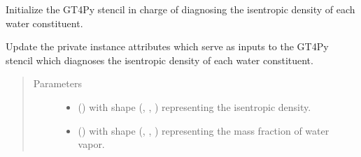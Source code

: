 \documentclass[letterpaper,10pt,english]{sphinxmanual}
\begin{document}
\begin{fulllineitems}
\begin{fulllineitems}
\begin{quote}
\begin{description}
\begin{itemize}
\end{itemize}


\end{description}\end{quote}

\end{fulllineitems}


\begin{fulllineitems}
\label{\detokenize{api:dycore.diagnostic_isentropic.DiagnosticIsentropic._stencil_diagnosing_water_constituents_isentropic_density_initialize}}
Initialize the GT4Py stencil in charge of diagnosing the isentropic density of each water constituent.

\end{fulllineitems}


\begin{fulllineitems}
\label{\detokenize{api:dycore.diagnostic_isentropic.DiagnosticIsentropic._stencil_diagnosing_water_constituents_isentropic_density_set_inputs}}
Update the private instance attributes which serve as inputs to the GT4Py stencil which diagnoses
the isentropic density of each water constituent.
\begin{quote}\begin{description}
\item[{Parameters}] \leavevmode\begin{itemize}
\item {} 
 () \textendash{}  with shape (, , ) representing the isentropic density.

\item {} 
 () \textendash{}  with shape (, , ) representing the mass fraction of
water vapor.


\end{itemize}
\end{description}
\end{quote}
\end{fulllineitems}
\end{fulllineitems}
\end{document}
